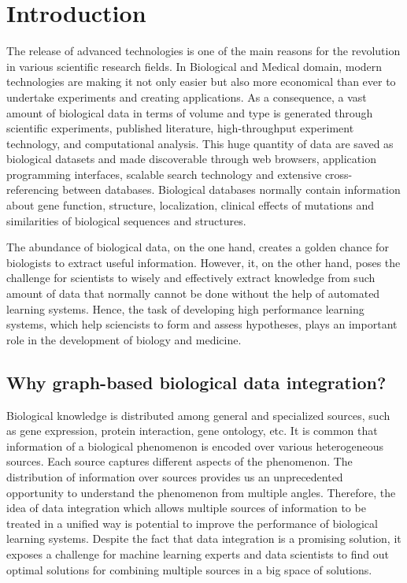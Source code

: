 \chapter{Introduction}
The release of advanced technologies is one of the main reasons for the revolution in various scientific research fields. In Biological and Medical domain, modern technologies are making it not only easier but also more economical than ever to undertake experiments and creating applications. As a consequence, a vast amount of biological data in terms of volume and type is generated through scientific experiments, published literature, high-throughput experiment technology, and computational analysis. This huge quantity of data are saved as biological datasets and made discoverable through web browsers, application programming interfaces, scalable search technology and extensive cross-referencing between databases. Biological databases normally contain information about gene function, structure, localization, clinical effects of mutations and similarities of biological sequences and structures.

The abundance of biological data, on the one hand, creates a golden chance for biologists to extract useful information. However, it, on the other hand, poses the challenge for scientists to wisely and effectively extract knowledge from such amount of data that normally cannot be done without the help of automated learning systems. Hence, the task of developing high performance learning systems, which help sciencists to form and assess hypotheses, plays an important role in the development of biology and medicine.
\section{Why graph-based biological data integration?}
Biological knowledge is distributed among general and specialized sources, such as gene expression, protein interaction, gene ontology, etc. It is common that information of a biological phenomenon is encoded over various heterogeneous sources. Each source captures different aspects of the phenomenon. The distribution of information over sources provides us an unprecedented opportunity to understand the phenomenon from multiple angles. Therefore, the idea of data integration which allows multiple sources of information to be treated in a unified way is potential to improve the performance of biological learning systems. Despite the fact that data integration is a promising solution, it exposes a challenge for machine learning experts and data scientists to find out optimal solutions for combining multiple sources in a big space of solutions.

